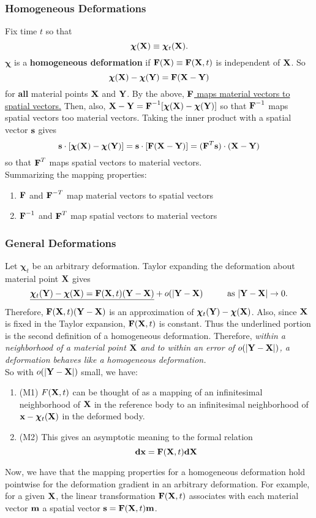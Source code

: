 \documentclass{article}
\newcommand{\Chi}{\boldsymbol{\chi}}
\begin{document}
\subsubsection{Homogeneous Deformations} Fix time $t$ so that $$\Chi(\X) \equiv \Chi_t(\X).$$
$\Chi$ is a \textbf{homogeneous deformation} if $\textbf{F}(\textbf{X}) \equiv \textbf{F}(\textbf{X},t)$ is independent of $\textbf{X}$. So
$$\Chi(\X) - \Chi(\Y) = \F(\X - \Y)$$
for \textbf{all} material points $\textbf{X}$ and $\textbf{Y}$. By the above, \underline{$\textbf{F}$ maps material vectors to spatial vectors.} Then, also, $\X - \Y = \F^{-1}[\Chi(\X) - \Chi(\Y)]$ so that $\textbf{F}^{-1}$ maps spatial vectors too material vectors. Taking the inner product with a spatial vector $\textbf{s}$ gives
$$\s \cdot [\Chi(\X) -\Chi(\Y)] = \s \cdot [\F(\X - \Y)]  = (\F^T\s)\cdot(\X - \Y)$$ so that $\textbf{F}^T$ maps spatial vectors to material vectors.\\
Summarizing the mapping properties:
\begin{enumerate}
	\item $\textbf{F}$ and $\textbf{F}^{-T}$ map material vectors to spatial vectors
	\item $\textbf{F}^{-1}$ and $\textbf{F}^T$ map spatial vectors to material vectors
\end{enumerate}

\subsubsection{General Deformations}
Let $\Chi_t$ be an arbitrary deformation. Taylor expanding the deformation about material point $\textbf{X}$ gives 
$$\underline{\Chi_t(\Y) - \Chi(\X) = \F(\X,t)(\Y - \X)} + o(|\Y - \X) \hspace{1cm} \text{as } |\Y - \X| \to 0.$$ Therefore, $\textbf{F}(\textbf{X},t)(\textbf{Y} - \textbf{X})$ is an approximation of $\Chi_t(\Y) - \Chi(\X)$. Also, since $\textbf{X}$ is fixed in the Taylor expansion, $\textbf{F}(\textbf{X},t)$ is constant. Thus
the underlined portion is the second definition of a homogeneous deformation. Therefore, \emph{within a neighborhood of a material point $\textbf{X}$ and to within an error of $o(|\textbf{Y} -\textbf{X}|)$, a deformation behaves like a homogeneous deformation.}\\
So with $o(|\textbf{Y} - \textbf{X}|)$ small, we have:
\begin{enumerate}
	\item (M1) $F(\textbf{X},t)$ can be thought of as a mapping of an infinitesimal neighborhood of $\textbf{X}$ in the reference body to an infinitesimal neighborhood of $\x - \Chi_t(\X)$ in the deformed body.
	\item (M2) This gives an asymptotic meaning to the formal relation
	$$\textbf{dx} = \textbf{F}(\textbf{X},t)\textbf{dX}$$
\end{enumerate}
Now, we have that the mapping properties for a homogeneous deformation hold pointwise for the deformation gradient in an arbitrary deformation. For example, for a given $\textbf{X}$, the linear transformation $\textbf{F}(\textbf{X},t)$ associates with each material vector $\textbf{m}$ a spatial vector $\textbf{s} = \textbf{F}(\textbf{X},t)\textbf{m}$.
\end{document}
